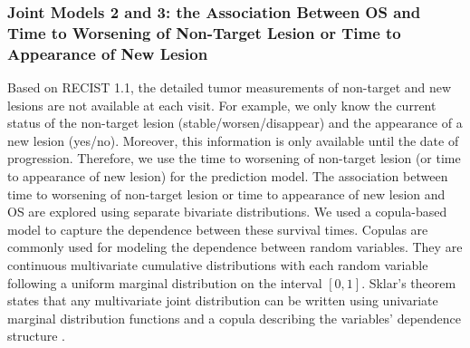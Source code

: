 \documentclass[aoas]{imsart}
\theoremstyle{plain}
\theoremstyle{remark}
\begin{document}
\subsubsection{Joint Models 2 and 3: the Association Between OS and Time to Worsening of Non-Target Lesion or Time to Appearance of New Lesion} \label{sec:NT}

Based on RECIST 1.1, the detailed tumor measurements of non-target and new lesions are not available at each visit. For example, we only know the current status of the non-target lesion (stable/worsen/disappear) and the appearance of a new lesion (yes/no). Moreover, this information is only available until the date of progression. Therefore, we use the time to worsening of non-target lesion (or time to appearance of new lesion) for the prediction model. The association between time to worsening of non-target lesion or time to appearance of new lesion and OS are explored using separate bivariate distributions. We used a copula-based model to capture the dependence between these survival times. Copulas are commonly used for modeling the dependence between random variables. They are continuous multivariate cumulative distributions with each random variable following a uniform marginal distribution on the interval $[0, 1]$. Sklar's theorem states that any multivariate joint distribution can be written using univariate marginal distribution functions and a copula describing the variables' dependence structure \citep{sklar1959fonctions}. 
\end{document}
